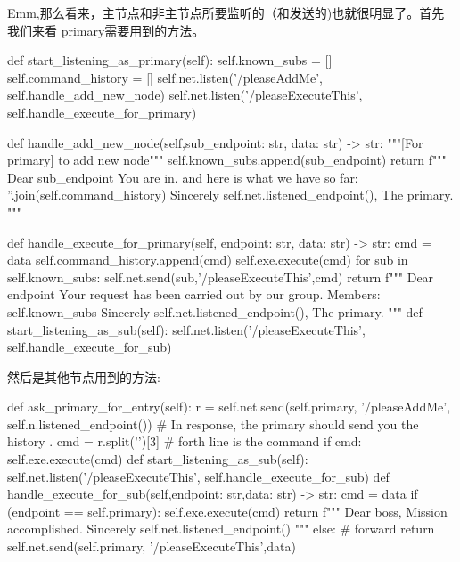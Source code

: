 \documentclass[dvipsnames]{ctexart}
\begin{document}
Emm,那么看来，主节点和非主节点所要监听的（和发送的)也就很明显了。首先我们来看
primary需要用到的方法。
\begin{simplepy}
    def start_listening_as_primary(self):
        self.known_subs = []
        self.command_history = []
        self.net.listen('/pleaseAddMe',
                        self.handle_add_new_node)
        self.net.listen('/pleaseExecuteThis',
                        self.handle_execute_for_primary)

    def handle_add_new_node(self,sub_endpoint: str,
                            data: str) -> str:
        """[For primary] to add new node"""
        self.known_subs.append(sub_endpoint)
        return f"""
        Dear {sub_endpoint}
            You are in. and here is what we have so far:
            {''.join(self.command_history)}
                   Sincerely
                   {self.net.listened_endpoint()}, The primary.
        """

    def handle_execute_for_primary(self, endpoint: str,
                                   data: str) -> str:
        cmd = data
        self.command_history.append(cmd)
        self.exe.execute(cmd)
        for sub in self.known_subs:
            self.net.send(sub,'/pleaseExecuteThis',cmd)
        return f"""
        Dear {endpoint}
             Your request has been carried out by our group.
             Members: {self.known_subs}
                 Sincerely
                 {self.net.listened_endpoint()}, The primary.
        """
    def start_listening_as_sub(self):
        self.net.listen('/pleaseExecuteThis',
                        self.handle_execute_for_sub)
\end{simplepy}
然后是其他节点用到的方法:
\begin{simplepy}
    def ask_primary_for_entry(self):
        r = self.net.send(self.primary,
                    '/pleaseAddMe',
                    self.n.listened_endpoint())
        # In response, the primary should send you the history .
        cmd = r.split('\n')[3]  # forth line is the command
        if cmd:
            self.exe.execute(cmd)
    def start_listening_as_sub(self):
        self.net.listen('/pleaseExecuteThis',
                        self.handle_execute_for_sub)
    def handle_execute_for_sub(self,endpoint: str,data: str) -> str:
        cmd = data
        if (endpoint == self.primary):
            self.exe.execute(cmd)
            return f"""
            Dear boss,
                 Mission accomplished.
                     Sincerely
                     {self.net.listened_endpoint()}
            """
        else:
            # forward
            return self.net.send(self.primary,
                                 '/pleaseExecuteThis',data)
\end{simplepy}
\end{document}
